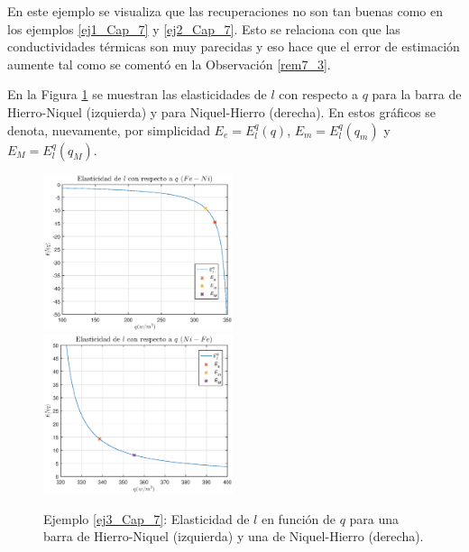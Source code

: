 En este ejemplo se visualiza que las recuperaciones no son tan buenas como en los ejemplos \ref{ej1_Cap_7} y \ref{ej2_Cap_7}. Esto se relaciona con que las conductividades t\'ermicas son muy parecidas y eso hace que el error de estimaci\'on aumente tal como se coment\'o en la Observaci\'on \ref{rem7_3}.

En la Figura \ref{Elast_3} se muestran las elasticidades de $l$ con respecto a $q$ para la barra de Hierro-Niquel (izquierda) y para Niquel-Hierro (derecha). En estos gr\'aficos se 
denota, nuevamente, por simplicidad $E_e=E_{l}^{q}(q)$, $E_m=E_{l}^{q}(q_m)$ y $E_M=E_{l}^{q}(q_M).$

\begin{figure}[!h]
\begin{center}
\includegraphics[width=0.495\textwidth]{7_Capitulo7/Graficos/Ejemplos/Ejemplo3/Elasticidad_Fe_Ni.eps}
\includegraphics[width=0.495\textwidth]{7_Capitulo7/Graficos/Ejemplos/Ejemplo3/Elasticidad_Ni_Fe.eps}
\vspace{-0.8cm} 
\caption{Ejemplo \ref{ej3_Cap_7}: Elasticidad de $l$ en funci\'on de $q$ para una barra de Hierro-Niquel (izquierda) y una de Niquel-Hierro (derecha).}
\vspace{-0.8cm} 
\label{Elast_3}
\end{center}
\end{figure}

